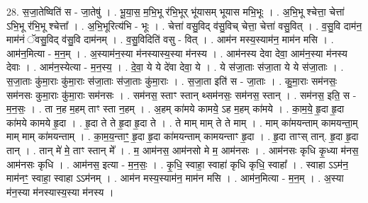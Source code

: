 \documentclass[17pt]{extarticle}
\begin{document}
28. स॒जा॒तेष्विति॑ स - जा॒तेषु॑ । . भू॒या॒स॒ म॒भि॒भू र॑भि॒भूर् भू॑यासम् भूयास मभि॒भूः । . अ॒भि॒भू श्चेत्ता॒ चेत्ता॑ ऽभि॒भू र॑भि॒भू श्चेत्ता᳚ । . अ॒भि॒भूरित्य॑भि - भूः । . चेत्ता॑ वसु॒विद् व॑सु॒विच् चेत्ता॒ चेत्ता॑ वसु॒वित् । . व॒सु॒वि दाम॑न॒ माम॑नं ॅवसु॒विद् व॑सु॒वि दाम॑नम् । . व॒सु॒विदिति॑ वसु - वित् । . आम॑न मस्य॒स्याम॑न॒ माम॑न मसि । . आम॑न॒मित्या - म॒न॒म् । . अ॒स्याम॑न॒स्या म॑नस्यास्य॒स्या म॑नस्य । . आम॑नस्य देवा देवा॒ आम॑न॒स्या म॑नस्य देवाः । . आम॑न॒स्येत्या - म॒न॒स्य॒ । . दे॒वा॒ ये ये दे॑वा देवा॒ ये । . ये स॑जा॒ताः स॑जा॒ता ये ये स॑जा॒ताः । . स॒जा॒ताः कु॑मा॒राः कु॑मा॒राः स॑जा॒ताः स॑जा॒ताः कु॑मा॒राः । . स॒जा॒ता इति॑ स - जा॒ताः । . कु॒मा॒राः सम॑नसः॒ सम॑नसः कुमा॒राः कु॑मा॒राः सम॑नसः । . सम॑नस॒ स्ताꣳ स्तान् थ्सम॑नसः॒ सम॑नस॒ स्तान् । . सम॑नस॒ इति॒ स - म॒न॒सः॒ । . ता न॒ह म॒हम् ताꣳ स्ता न॒हम् । . अ॒हम् का॑मये कामये॒ ऽह म॒हम् का॑मये । . का॒म॒ये॒ हृ॒दा हृ॒दा का॑मये कामये हृ॒दा । . हृ॒दा ते ते हृ॒दा हृ॒दा ते । . ते माम् माम् ते ते माम् । . माम् का॑मयन्ताम् कामयन्ता॒म् माम् माम् का॑मयन्ताम् । . का॒म॒य॒न्ताꣳ॒॒ हृ॒दा हृ॒दा का॑मयन्ताम् कामयन्ताꣳ हृ॒दा । . हृ॒दा ताꣳस् तान्. हृ॒दा हृ॒दा तान् । . तान् मे॑ मे॒ ताꣳ स्तान् मे᳚ । . म॒ आम॑नस॒ आम॑नसो मे म॒ आम॑नसः । . आम॑नसः कृधि कृ॒ध्या म॑नस॒ आम॑नसः कृधि । . आम॑नस॒ इत्या - म॒न॒सः॒ । . कृ॒धि॒ स्वाहा॒ स्वाहा॑ कृधि कृधि॒ स्वाहा᳚ । . स्वाहा ऽऽम॑न॒ माम॑नꣳ॒॒ स्वाहा॒ स्वाहा ऽऽम॑नम् । . आम॑न मस्य॒स्याम॑न॒ माम॑न मसि । . आम॑न॒मित्या - म॒न॒म् । . अ॒स्या म॑न॒स्या म॑नस्यास्य॒स्या म॑नस्य । \newline
\end{document}
